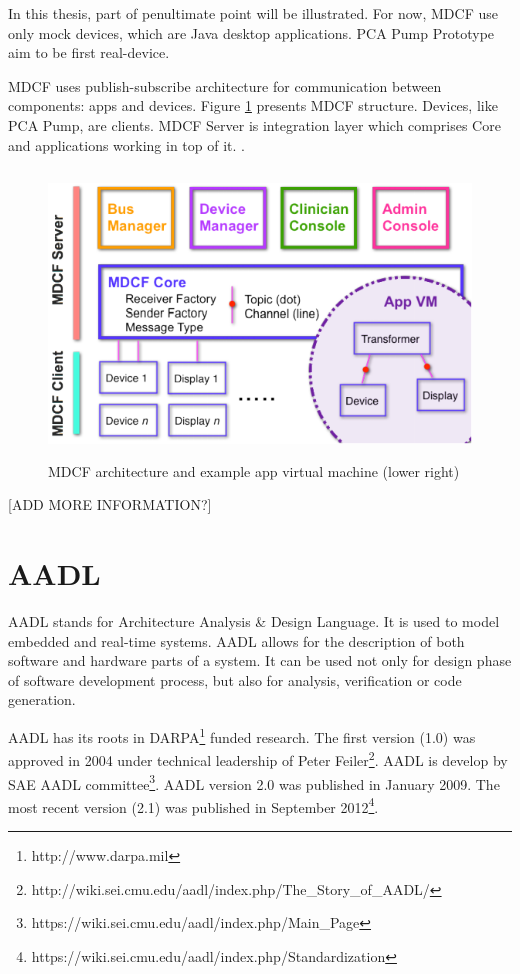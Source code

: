 In this thesis, part of penultimate point will be illustrated. For now, MDCF use only mock devices, which are Java desktop applications. PCA Pump Prototype aim to be first real-device.

MDCF uses publish-subscribe architecture for communication between components: apps and devices. Figure \ref{figure:mdcf} presents MDCF structure. Devices, like PCA Pump, are clients. MDCF Server is integration layer which comprises Core and applications working in top of it. \cite{MDCF:Paper}.

\begin{figure}[ht]%
    \begin{center}
    	\includegraphics[height=3in]{figures/mdcf.png}    	
    \end{center}
    \caption{MDCF architecture and example app virtual machine (lower right)}
    \label{figure:mdcf}
\end{figure}

[ADD MORE INFORMATION?]



\section{AADL}
\label{background:aadl}

AADL stands for Architecture Analysis \& Design Language. It is used to model embedded and real-time systems. AADL allows for the description of both software and hardware parts of a system. It can be used not only for design phase of software development process, but also for analysis, verification or code generation.

AADL has its roots in DARPA\footnote{http://www.darpa.mil} funded research. The first version (1.0) was approved in 2004 under technical leadership of Peter Feiler\footnote{http://wiki.sei.cmu.edu/aadl/index.php/The\_Story\_of\_AADL/}. AADL is develop by SAE AADL committee\footnote{https://wiki.sei.cmu.edu/aadl/index.php/Main\_Page}. AADL version 2.0 was published in January 2009. The most recent version (2.1) was published in September 2012\footnote{https://wiki.sei.cmu.edu/aadl/index.php/Standardization}.

